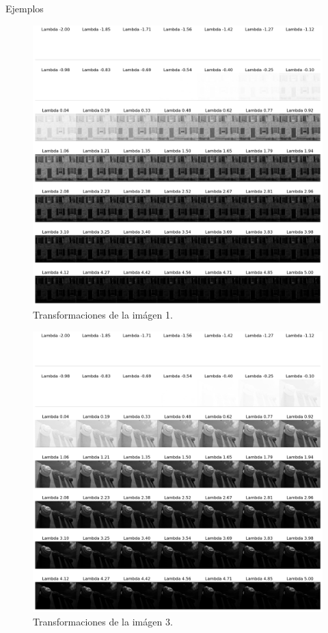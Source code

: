 \documentclass{beamer}
\begin{document}
\begin{frame}{Ejemplos}
    \begin{figure}
        \centering
        \includegraphics[width=\textwidth]{all_lambda_1.png}
        \caption{Transformaciones de la im\'agen 1.}
        \label{fig:all_lambda_1}
    \end{figure}

    \begin{figure}
        \centering
        \includegraphics[width=\textwidth]{all_lambda_3.png}
        \caption{Transformaciones de la im\'agen 3.}
        \label{fig:all_lambda_2}
    \end{figure}


\end{frame}
\end{document}

